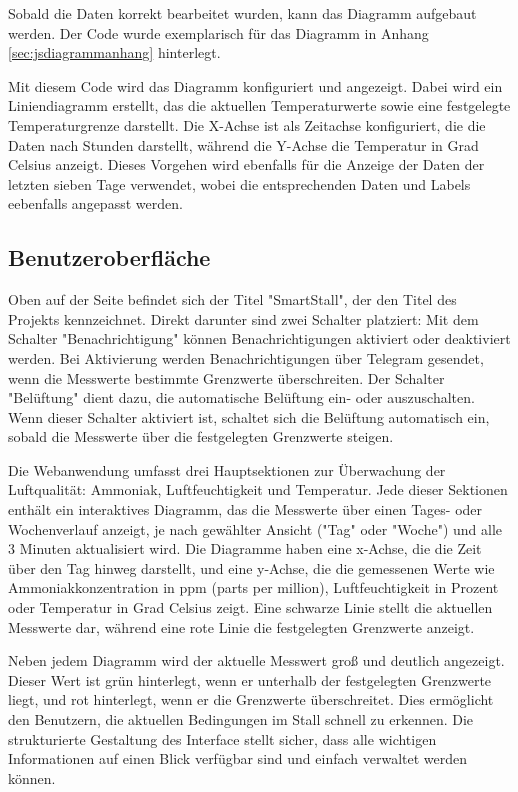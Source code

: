 \documentclass[conference]{IEEEtran}
\begin{document}
Sobald die Daten korrekt bearbeitet wurden, kann das Diagramm aufgebaut werden. Der Code wurde exemplarisch für das Diagramm in Anhang \ref{sec:jsdiagrammanhang} hinterlegt.

Mit diesem Code wird das Diagramm konfiguriert und angezeigt. Dabei wird ein Liniendiagramm erstellt, das die aktuellen Temperaturwerte sowie eine festgelegte Temperaturgrenze darstellt. Die X-Achse ist als Zeitachse konfiguriert, die die Daten nach Stunden darstellt, während die Y-Achse die Temperatur in Grad Celsius anzeigt.
Dieses Vorgehen wird ebenfalls für die Anzeige der Daten der letzten sieben Tage verwendet, wobei die entsprechenden Daten und Labels eebenfalls angepasst werden.

\subsection{Benutzeroberfläche}
\label{ui}
Oben auf der Seite befindet sich der Titel "SmartStall", der den Titel des Projekts kennzeichnet. Direkt darunter sind zwei Schalter platziert: Mit dem Schalter "Benachrichtigung" können Benachrichtigungen aktiviert oder deaktiviert werden. Bei Aktivierung werden Benachrichtigungen über Telegram gesendet, wenn die Messwerte bestimmte Grenzwerte überschreiten. Der Schalter "Belüftung" dient dazu, die automatische Belüftung ein- oder auszuschalten. Wenn dieser Schalter aktiviert ist, schaltet sich die Belüftung automatisch ein, sobald die Messwerte über die festgelegten Grenzwerte steigen.

Die Webanwendung umfasst drei Hauptsektionen zur Überwachung der Luftqualität: Ammoniak, Luftfeuchtigkeit und Temperatur. Jede dieser Sektionen enthält ein interaktives Diagramm, das die Messwerte über einen Tages- oder Wochenverlauf anzeigt, je nach gewählter Ansicht ("Tag" oder "Woche") und alle 3 Minuten aktualisiert wird. Die Diagramme haben eine x-Achse, die die Zeit über den Tag hinweg darstellt, und eine y-Achse, die die gemessenen Werte wie Ammoniakkonzentration in ppm (parts per million), Luftfeuchtigkeit in Prozent oder Temperatur in Grad Celsius zeigt. Eine schwarze Linie stellt die aktuellen Messwerte dar, während eine rote Linie die festgelegten Grenzwerte anzeigt.

Neben jedem Diagramm wird der aktuelle Messwert groß und deutlich angezeigt. Dieser Wert ist grün hinterlegt, wenn er unterhalb der festgelegten Grenzwerte liegt, und rot hinterlegt, wenn er die Grenzwerte überschreitet. Dies ermöglicht den Benutzern, die aktuellen Bedingungen im Stall schnell zu erkennen.
Die strukturierte Gestaltung des Interface stellt sicher, dass alle wichtigen Informationen auf einen Blick verfügbar sind und einfach verwaltet werden können.
\end{document}
